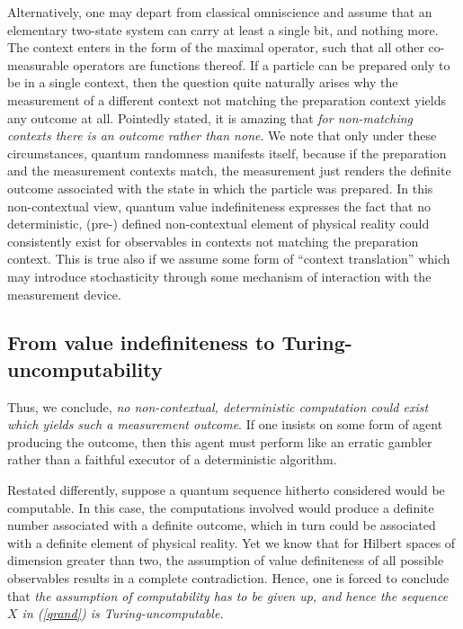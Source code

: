 \documentclass[pra,amsfonts,preprint,showkeys]{revtex4}
\begin{document}
Alternatively, one may depart from classical omniscience and assume that
an elementary two-state system can carry at least a single bit,
and nothing more.
The context enters in the form of the maximal operator, such that all other co-measurable operators
are functions thereof.
If a particle can be prepared only to be in a single context,
then the question quite naturally arises why the measurement
of a different context not matching the preparation context
yields any outcome at all.
Pointedly stated, it is amazing that {\it for non-matching contexts there is an outcome rather than none}.
We note that only under these circumstances, quantum randomness manifests itself,
because if the preparation and the measurement contexts match,
the measurement just renders the definite outcome associated with
the state in which the particle was prepared.
In this non-contextual view, quantum value indefiniteness
expresses the fact that no deterministic, (pre-) defined non-contextual element of physical reality
could consistently exist for observables in contexts not matching the preparation context.
This is true also if we assume some form of ``context translation'' which may introduce stochasticity
through some mechanism of interaction with the measurement device.


\subsection{From value indefiniteness to Turing-uncomputability}

Thus, we conclude, {\it no non-contextual, deterministic computation could exist which
yields such a measurement outcome}.
If one insists on some form of agent producing the outcome,
then this agent  must perform like an erratic gambler
rather than a faithful executor of a deterministic algorithm.

Restated differently, suppose
a quantum sequence hitherto considered would be computable.
In this case, the computations involved would produce a definite number associated with
a definite outcome, which in turn could be associated
with a definite element of physical reality.
Yet we know that for Hilbert spaces of dimension greater than two,
the assumption of value definiteness of all possible observables
results in a complete contradiction.
Hence, one is forced to conclude that  {\it  the assumption of computability has to be given up,
and hence the  sequence $X$ in (\ref{qrand})  is Turing-uncomputable.}
\end{document}

